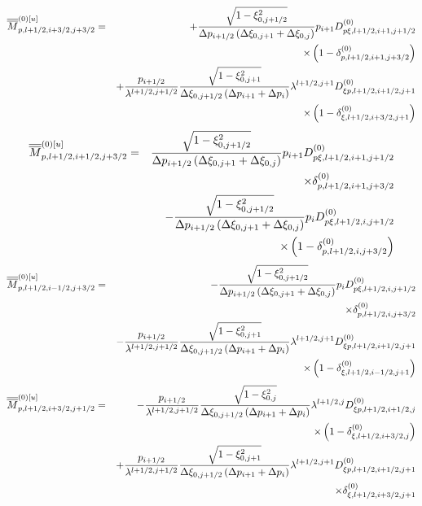 \begin{eqnarray}
\overline{\overline{M}}_{p,l+1/2,i+3/2,j+3/2}^{\left( 0\right) \left[ u%
\right] } &=&+\frac{\sqrt{1-\xi _{0,j+1/2}^{2}}}{\Delta p_{i+1/2}\left(
\Delta \xi _{0,j+1}+\Delta \xi _{0,j}\right) }p_{i+1}D_{p\xi
,l+1/2,i+1,j+1/2}^{\left( 0\right) }  \notag \\
&&\times \left( 1-\delta _{p,l+1/2,i+1,j+3/2}^{\left( 0\right) }\right)  
\notag \\
&&+\frac{p_{i+1/2}}{\lambda ^{l+1/2,j+1/2}}\frac{\sqrt{1-\xi _{0,j+1}^{2}}}{%
\Delta \xi _{0,j+1/2}\left( \Delta p_{i+1}+\Delta p_{i}\right) }\lambda
^{l+1/2,j+1}D_{\xi p,l+1/2,i+1/2,j+1}^{\left( 0\right) }  \notag \\
&&\times \left( 1-\delta _{\xi ,l+1/2,i+3/2,j+1}^{\left( 0\right) }\right) 
\end{eqnarray}%
\begin{eqnarray}
\overline{\overline{M}}_{p,l+1/2,i+1/2,j+3/2}^{\left( 0\right) \left[ u%
\right] } &=&\frac{\sqrt{1-\xi _{0,j+1/2}^{2}}}{\Delta p_{i+1/2}\left(
\Delta \xi _{0,j+1}+\Delta \xi _{0,j}\right) }p_{i+1}D_{p\xi
,l+1/2,i+1,j+1/2}^{\left( 0\right) }  \notag \\
&&\times \delta _{p,l+1/2,i+1,j+3/2}^{\left( 0\right) }  \notag \\
&&-\frac{\sqrt{1-\xi _{0,j+1/2}^{2}}}{\Delta p_{i+1/2}\left( \Delta \xi
_{0,j+1}+\Delta \xi _{0,j}\right) }p_{i}D_{p\xi ,l+1/2,i,j+1/2}^{\left(
0\right) }  \notag \\
&&\times \left( 1-\delta _{p,l+1/2,i,j+3/2}^{\left( 0\right) }\right) 
\end{eqnarray}%
\begin{eqnarray}
\overline{\overline{M}}_{p,l+1/2,i-1/2,j+3/2}^{\left( 0\right) \left[ u%
\right] } &=&-\frac{\sqrt{1-\xi _{0,j+1/2}^{2}}}{\Delta p_{i+1/2}\left(
\Delta \xi _{0,j+1}+\Delta \xi _{0,j}\right) }p_{i}D_{p\xi
,l+1/2,i,j+1/2}^{\left( 0\right) }  \notag \\
&&\times \delta _{p,l+1/2,i,j+3/2}^{\left( 0\right) }  \notag \\
&&-\frac{p_{i+1/2}}{\lambda ^{l+1/2,j+1/2}}\frac{\sqrt{1-\xi _{0,j+1}^{2}}}{%
\Delta \xi _{0,j+1/2}\left( \Delta p_{i+1}+\Delta p_{i}\right) }\lambda
^{l+1/2,j+1}D_{\xi p,l+1/2,i+1/2,j+1}^{\left( 0\right) }  \notag \\
&&\times \left( 1-\delta _{\xi ,l+1/2,i-1/2,j+1}^{\left( 0\right) }\right) 
\end{eqnarray}%
\begin{eqnarray}
\overline{\overline{M}}_{p,l+1/2,i+3/2,j+1/2}^{\left( 0\right) \left[ u%
\right] } &=&-\frac{p_{i+1/2}}{\lambda ^{l+1/2,j+1/2}}\frac{\sqrt{1-\xi
_{0,j}^{2}}}{\Delta \xi _{0,j+1/2}\left( \Delta p_{i+1}+\Delta p_{i}\right) }%
\lambda ^{l+1/2,j}D_{\xi p,l+1/2,i+1/2,j}^{\left( 0\right) }  \notag \\
&&\times \left( 1-\delta _{\xi ,l+1/2,i+3/2,j}^{\left( 0\right) }\right)  
\notag \\
&&+\frac{p_{i+1/2}}{\lambda ^{l+1/2,j+1/2}}\frac{\sqrt{1-\xi _{0,j+1}^{2}}}{%
\Delta \xi _{0,j+1/2}\left( \Delta p_{i+1}+\Delta p_{i}\right) }\lambda
^{l+1/2,j+1}D_{\xi p,l+1/2,i+1/2,j+1}^{\left( 0\right) }  \notag \\
&&\times \delta _{\xi ,l+1/2,i+3/2,j+1}^{\left( 0\right) }
\end{eqnarray}%
